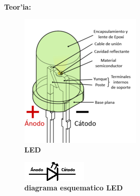 \documentclass[11pt, letterpaper]{report}
\newcommand{\Center}[1]{
	\begin{center}
		#1
	\end{center}
} %
\newenvironment{block}[1]{\hspace{-0.8 cm}\textbf{\Large #1}}{\vspace{3 mm}} %
\begin{document}
\begin{block}{Teor'ia:}
		\begin{minipage}{.5\textwidth}
			\begin{figure}[H]
				\Center{
					\includegraphics[scale=.4]{LED.png}
					\caption{\textbf{LED}}
				}
			\end{figure}
		\end{minipage} 
		\begin{minipage}{.5\textwidth}
			\begin{figure}[H]
				\Center{
					\includegraphics[scale=.8]{Led_esquematico.png}
					\caption{\textbf{diagrama esquematico LED}}
				}
			\end{figure}
		\end{minipage}
	\end{block}
		
\end{document}

